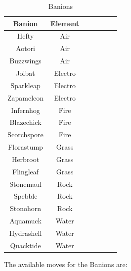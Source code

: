 \documentclass[12pt, a4paper]{report}
\theoremstyle{definition}
\begin{document}
\begin{table}[ht]
    \begin{center}
    \begin{tabular}{| c | c | c | c | c | c | c |}
        \hline
        Banion & Element \\ [0.5ex] %
        \hline\hline
        Hefty & Air \\
        \hline
        Aotori & Air \\
        \hline
        Buzzwings & Air \\
        \hline
        Jolbat & Electro \\
        \hline
        Sparkleap & Electro \\
        \hline
        Zapameleon & Electro \\
        \hline
        Infernhog & Fire \\
        \hline
        Blazechick & Fire \\
        \hline
        Scorchspore & Fire \\
        \hline
        Florastump & Grass \\
        \hline
        Herbroot & Grass \\
        \hline
        Flingleaf & Grass \\
        \hline
        Stonemaul & Rock \\
        \hline
        Spebble & Rock \\
        \hline
        Stonohorn & Rock \\
        \hline
        Aquamuck & Water \\
        \hline
        Hydrashell & Water \\
        \hline
        Quacktide & Water \\
        \hline
    \end{tabular}
    \caption{\label{table:banions} Banions}
    \end{center}
\end{table}

    The available moves for the Banions are:
\end{document}
